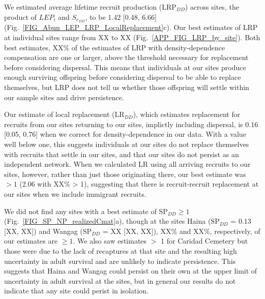 \documentclass[12pt, oneside]{article}   	%
\begin{document}
We estimated average lifetime recruit production ($\text{LRP}_{DD}$) across sites, the product of $LEP_i$ and $S_{e_{DD}}$, to be 1.42 [0.48, 6.66] (Fig.\ \ref{FIG_Abun_LEP_LRP_LocalReplacement}c). Our best estimates of LRP at individual sites range from XX to XX (Fig.\ \ref{APP_FIG_LRP_by_site}). Both best estimates, XX\% of the estimates of LRP with density-dependence compensation are one or larger, above the threshold necessary for replacement before considering dispersal. This means that individuals at our sites produce enough surviving offspring before considering dispersal to be able to replace themselves, but LRP does not tell us whether those offspring will settle within our sample sites and drive persistence. %

Our estimate of local replacement ($\text{LR}_{DD}$), which estimates replacement for recruits from our sites returning to our sites, implictly including dispersal, is 0.16 [0.05, 0.76] when we correct for density-dependence in our data. With a value well below one, this suggests individuals at our sites do not replace themselves with recruits that settle in our sites, and that our sites do not persist as an independent network. When we calculated LR using all arriving recruits to our sites, however, rather than just those originating there, our best estimate was $> 1$ (2.06 with XX\% > 1), suggesting that there is recruit-recruit replacement at our sites when we include immigrant recruits.

We did not find any sites with a best estimate of $\text{SP}_{DD} \geq 1$ (Fig.\ \ref{FIG_SP_NP_realizedCmat}a), though at the sites Haina ($\text{SP}_{DD}$ = 0.13 [XX, XX]) and Wangag ($\text{SP}_{DD}$ = XX [XX, XX]), XX\% and XX\%, respectively, of our estimates are $\geq 1$. We also saw estimates $>$ 1 for Caridad Cemetery but those were due to the lack of recaptures at that site and the resulting high uncertainty in adult survival and are unlikely to indicate persistence. This suggests that Haina and Wangag could persist on their own at the upper limit of uncertainty in adult survival at the sites, but in general our results do not indicate that any site could perist in isolation. %
\end{document}
